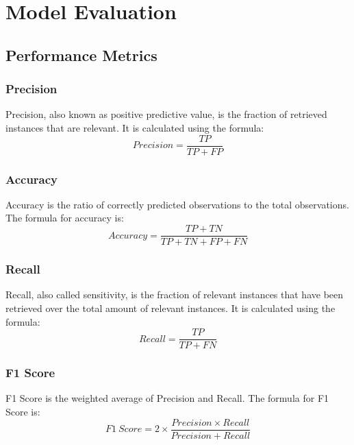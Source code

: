 \section{Model Evaluation}
\subsection{Performance Metrics}

\subsubsection{Precision}
Precision, also known as positive predictive value, is the fraction of retrieved instances that are relevant. It is calculated using the formula:
\[ Precision = \frac{TP}{TP + FP} \]

\subsubsection{Accuracy}
Accuracy is the ratio of correctly predicted observations to the total observations. The formula for accuracy is:
\[ Accuracy = \frac{TP + TN}{TP + TN + FP + FN} \]

\subsubsection{Recall}
Recall, also called sensitivity, is the fraction of relevant instances that have been retrieved over the total amount of relevant instances. It is calculated using the formula:
\[ Recall = \frac{TP}{TP + FN} \]

\subsubsection{F1 Score}
F1 Score is the weighted average of Precision and Recall. The formula for F1 Score is:
\[ F1\ Score = 2 \times \frac{Precision \times Recall}{Precision + Recall} \]



























\clearpage 

